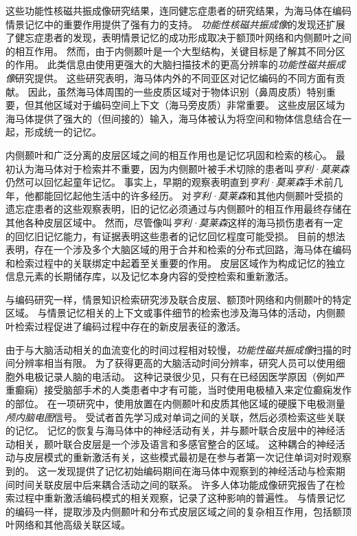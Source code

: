 这些功能性核磁共振成像研究结果，连同健忘症患者的研究结果，为海马体在编码情景记忆中的重要作用提供了强有力的支持。
\textit{功能性核磁共振成像}的发现还扩展了健忘症患者的发现，表明情景记忆的成功形成取决于额顶叶网络和内侧颞叶之间的相互作用。
然而，由于内侧颞叶是一个大型结构，关键目标是了解其不同分区的作用。
此类信息由使用更强大的大脑扫描技术的更高分辨率的\textit{功能性磁共振成像}研究提供。
这些研究表明，海马体内外的不同亚区对记忆编码的不同方面有贡献。
因此，虽然海马体周围的一些皮质区域对于物体识别（鼻周皮质）特别重要，但其他区域对于编码空间上下文（海马旁皮质）非常重要。
这些皮层区域为海马体提供了强大的（但间接的）输入，海马体被认为将空间和物体信息结合在一起，形成统一的记忆。


内侧颞叶和广泛分离的皮层区域之间的相互作用也是记忆巩固和检索的核心。
最初认为海马体对于检索并不重要，因为内侧颞叶被手术切除的患者叫\textit{亨利·莫莱森}仍然可以回忆起童年记忆。
事实上，早期的观察表明直到\textit{亨利·莫莱森}手术前几年，他都能回忆起他生活中的许多经历。
对\textit{亨利·莫莱森}和其他内侧颞叶受损的遗忘症患者的这些观察表明，旧的记忆必须通过与内侧颞叶的相互作用最终存储在其他各种皮层区域中。
然而，尽管像叫\textit{亨利·莫莱森}这样的海马损伤患者有一定的回忆旧记忆能力，有证据表明这些患者的记忆回忆程度可能受损。
目前的想法表明，存在一个涉及多个大脑区域的用于合并和检索的分布式回路，海马体在编码和检索过程中的关联绑定中起着至关重要的作用。
皮层区域作为构成记忆的独立信息元素的长期储存库，以及记忆本身内容的受控检索和重新激活。


与编码研究一样，情景知识检索研究涉及联合皮层、额顶叶网络和内侧颞叶的特定区域。
与情景记忆相关的上下文或事件细节的检索也涉及海马体的活动，内侧颞叶检索过程促进了编码过程中存在的新皮层表征的激活。


由于与大脑活动相关的血流变化的时间过程相对较慢，\textit{功能性磁共振成像}扫描的时间分辨率相当有限。
为了获得更高的大脑活动时间分辨率，研究人员可以使用细胞外电极记录人脑的电活动。
这种记录很少见，只有在已经因医学原因（例如严重癫痫）接受脑部手术的人类患者中才有可能，当时使用电极植入来定位癫痫发作的部位。
在一项研究中，使用放置在内侧颞叶和皮质其他区域的硬膜下电极测量\textit{颅内脑电图}信号。
受试者首先学习成对单词之间的关联，然后必须检索这些关联的记忆。
记忆的恢复与海马体中的神经活动有关，并与颞叶联合皮层中的神经活动相关，颞叶联合皮层是一个涉及语言和多感官整合的区域。
这种耦合的神经活动与皮层模式的重新激活有关，这些模式最初是在参与者第一次记住单词对时观察到的。
这一发现提供了记忆初始编码期间在海马体中观察到的神经活动与检索期间时间关联皮层中后来耦合活动之间的联系。
许多人体功能成像研究报告了在检索过程中重新激活编码模式的相关观察，记录了这种影响的普遍性。
与情景记忆的编码一样，提取涉及内侧颞叶和分布式皮层区域之间的复杂相互作用，包括额顶叶网络和其他高级关联区域。



